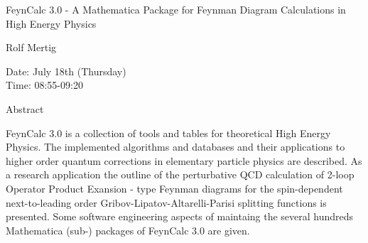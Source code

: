 \begin{center}
\LARGE
FeynCalc 3.0 - A Mathematica Package for Feynman
        Diagram Calculations in High Energy Physics
\end{center}

\begin{center}
\Large
Rolf Mertig

\end{center}

\noindent
Date:  July 18th (Thursday)\\
Time:  08:55-09:20\\

\begin{center}
\large
Abstract
\end{center}

FeynCalc 3.0 is a collection of tools and tables for theoretical High Energy Physics. The
implemented algorithms and databases and their applications to higher order quantum corrections
in elementary particle physics are described. As a research application the outline of the
perturbative QCD calculation of 2-loop Operator Product Exansion - type Feynman diagrams for
the spin-dependent next-to-leading order Gribov-Lipatov-Altarelli-Parisi splitting functions is
presented. Some software engineering aspects of maintaing the several hundreds Mathematica
(sub-) packages of FeynCalc 3.0 are given. 

